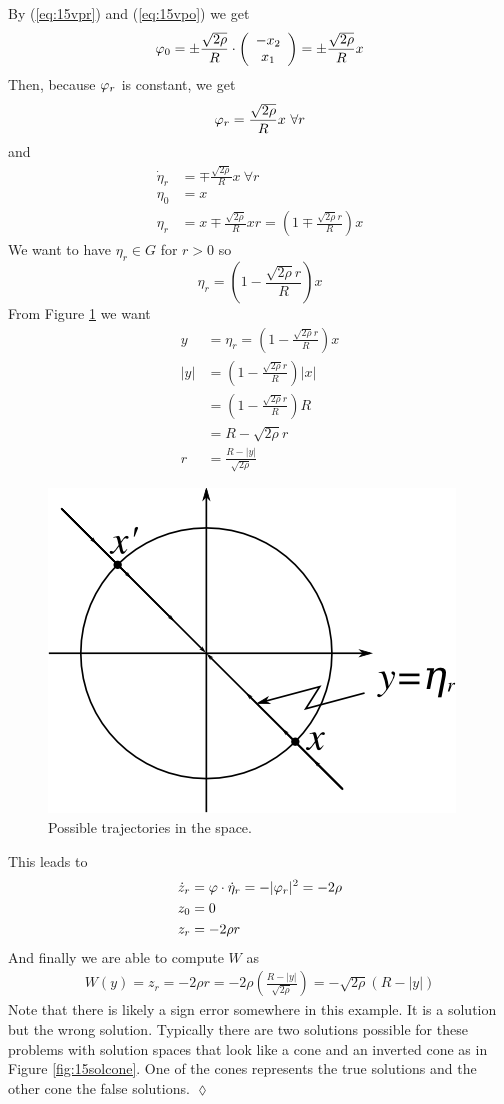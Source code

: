 \begin{example}
By (\ref{eq:15vpr}) and (\ref{eq:15vpo}) we get
$$\varphi_0 = \pm\frac{\sqrt{2\rho}}{R}\cdot\left(\begin{array}{c} -x_2 \\ x_1 \end{array}\right) = \pm\frac{\sqrt{2\rho}}{R}x$$
Then, because $\varphi_r$ is constant, we get
$$\varphi_r = \frac{\sqrt{2\rho}}{R}x ~\forall r$$
and
\begin{align*}
\dot{\eta}_r &= \mp \frac{\sqrt{2\rho}}{R}x ~\forall r \\
\eta_0 &= x \\
\eta_r &= x\mp\frac{\sqrt{2\rho}}{R}xr = \left(1\mp\frac{\sqrt{2\rho}r}{R}\right)x
\end{align*}
We want to have $\eta_r\in G$ for $r>0$ so
$$\eta_r = \left(1-\frac{\sqrt{2\rho}r}{R}\right)x$$
From Figure \ref{fig:15traj} we want
\begin{align*}
y &= \eta_r = \left(1-\frac{\sqrt{2\rho}r}{R}\right)x \\
|y| &= \left(1-\frac{\sqrt{2\rho}r}{R}\right)|x| \\
&= \left(1-\frac{\sqrt{2\rho}r}{R}\right)R \\
&= R-\sqrt{2\rho}r \\
r &= \frac{R-|y|}{\sqrt{2\rho}}
\end{align*}

\begin{figure}[ht!]
	\centering
	\includegraphics[width=.4\textwidth]{images/15traj}
	\caption{Possible trajectories in the space.}
	\label{fig:15traj}
\end{figure}

This leads to
\begin{align*}
\dot{z}_r &= \varphi\cdot\dot{\eta}_r = -|\varphi_r|^2 = -2\rho \\
z_0 &= 0 \\
z_r &= -2\rho r
\end{align*}
And finally we are able to compute $W$ as
\begin{align*}
\boxed{W(y) = z_r = -2\rho r = -2\rho\left(\frac{R-|y|}{\sqrt{2\rho}}\right) = -\sqrt{2\rho}(R-|y|)}
\end{align*}
Note that there is likely a sign error somewhere in this example. It is a solution but the wrong solution. Typically there are two solutions possible for these problems with solution spaces that look like a cone and an inverted cone as in Figure \ref{fig:15solcone}. One of the cones represents the true solutions and the other cone the false solutions.
$\lozenge$
\end{example}

